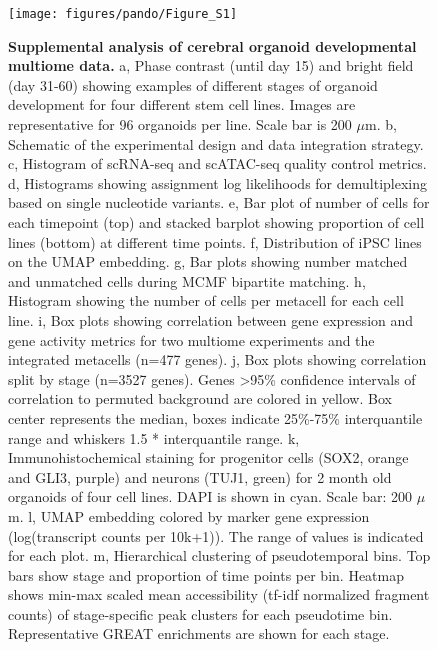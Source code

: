 
\begin{figure}[h!]
    \centering
	\texttt{[image: figures/pando/Figure\_S1]}
    \label{fig:regS1}
\end{figure}

\clearpage

\begin{figure}[t!]
    \centering
    \caption{\textbf{Supplemental analysis of cerebral organoid developmental multiome data.} a, Phase contrast (until day 15) and bright field (day 31-60) showing examples of different stages of organoid development for four different stem cell lines. Images are representative for 96 organoids per line. Scale bar is 200 $\mu$m. b, Schematic of the experimental design and data integration strategy. c, Histogram of scRNA-seq and scATAC-seq quality control metrics. d, Histograms showing assignment log likelihoods for demultiplexing based on single nucleotide variants. e, Bar plot of number of cells for each timepoint (top) and stacked barplot showing proportion of cell lines (bottom) at different time points. f, Distribution of iPSC lines on the UMAP embedding. g, Bar plots showing number matched and unmatched cells during MCMF bipartite matching. h, Histogram showing the number of cells per metacell for each cell line. i, Box plots showing correlation between gene expression and gene activity metrics for two multiome experiments and the integrated metacells (n=477 genes). j, Box plots showing correlation split by stage (n=3527 genes). Genes >95\% confidence intervals of correlation to permuted background are colored in yellow. Box center represents the median, boxes indicate 25\%-75\% interquantile range and whiskers 1.5 * interquantile range. k, Immunohistochemical staining for progenitor cells (SOX2, orange and GLI3, purple) and neurons (TUJ1, green) for 2 month old organoids of four cell lines. DAPI is shown in cyan. Scale bar: 200 $\mu$m. l, UMAP embedding colored by marker gene expression (log(transcript counts per 10k+1)). The range of values is indicated for each plot. m, Hierarchical clustering of pseudotemporal bins. Top bars show stage and proportion of time points per bin. Heatmap shows min-max scaled mean accessibility (tf-idf normalized fragment counts) of stage-specific peak clusters for each pseudotime bin. Representative GREAT enrichments are shown for each stage.}
\end{figure}


